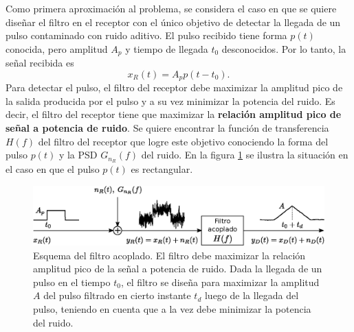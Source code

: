 \documentclass[a4paper]{article}
\begin{document}
Como primera aproximación al problema, se considera el caso en que se quiere diseñar el filtro en el receptor con el único objetivo de detectar la llegada de un pulso contaminado con ruido aditivo. El pulso recibido tiene forma \(p(t)\) conocida, pero amplitud \(A_p\) y tiempo de llegada \(t_0\) desconocidos. Por lo tanto, la señal recibida es
\begin{equation}\label{eq:xr}
 x_R(t)=A_pp(t-t_0).
\end{equation}
Para detectar el pulso, el filtro del receptor debe maximizar la amplitud pico de la salida producida por el pulso y a su vez minimizar la potencia del ruido. Es decir, el filtro del receptor tiene que maximizar la \textbf{relación amplitud pico de señal a potencia de ruido}. Se quiere encontrar la función de transferencia \(H(f)\) del filtro del receptor que logre este objetivo conociendo la forma del pulso \(p(t)\) y la PSD \(G_{n_R}(f)\) del ruido. En la figura \ref{fig:matched_filter_scheme} se ilustra la situación en el caso en que el pulso \(p(t)\) es rectangular.
\begin{figure}[!htb]
\begin{center}
\includegraphics[width=0.9\columnwidth]{figuras/matched_filter_scheme_v2.eps}
\caption{\label{fig:matched_filter_scheme} Esquema del filtro acoplado. El filtro debe maximizar la relación amplitud pico de la señal a potencia de ruido. Dada la llegada de un pulso en el tiempo \(t_0\), el filtro se diseña para maximizar la amplitud \(A\) del pulso filtrado en cierto instante \(t_d\) luego de la llegada del pulso, teniendo en cuenta que a la vez debe minimizar la potencia del ruido.}
\end{center}
\end{figure}
\end{document}
